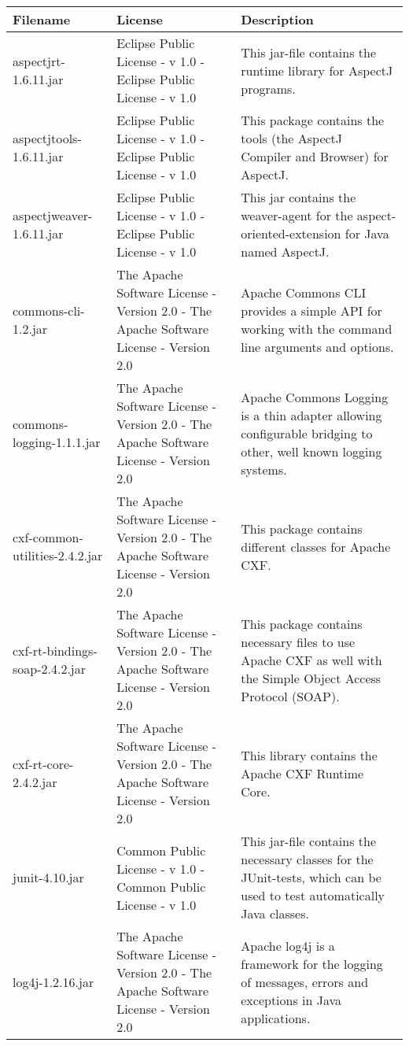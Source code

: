 \begin{center}
\begin{longtable}{|p{}|p{}|p{}|}
\hline 
Filename & License & Description\\
\hline
\hline 
aspectjrt-1.6.11.jar & Eclipse Public License - v 1.0 - Eclipse Public License - v 1.0 & This jar-file contains the runtime library for AspectJ programs.\\
\hline 
aspectjtools-1.6.11.jar & Eclipse Public License - v 1.0 - Eclipse Public License - v 1.0 & This package contains the tools (the AspectJ Compiler and Browser) for AspectJ.\\
\hline 
aspectjweaver-1.6.11.jar & Eclipse Public License - v 1.0 - Eclipse Public License - v 1.0 & This jar contains the weaver-agent for the aspect-oriented-extension for Java named AspectJ.\\
\hline 
commons-cli-1.2.jar & The Apache Software License - Version 2.0 - The Apache Software License - Version 2.0 & Apache Commons CLI provides a simple API for working with the command line arguments and options.\\
\hline 
commons-logging-1.1.1.jar & The Apache Software License - Version 2.0 - The Apache Software License - Version 2.0 & Apache Commons Logging is a thin adapter allowing configurable bridging to other, well known logging systems.\\
\hline 
cxf-common-utilities-2.4.2.jar & The Apache Software License - Version 2.0 - The Apache Software License - Version 2.0 & This package contains different classes for Apache CXF.\\
\hline 
cxf-rt-bindings-soap-2.4.2.jar & The Apache Software License - Version 2.0 - The Apache Software License - Version 2.0 & This package contains necessary files to use Apache CXF as well with the Simple Object Access Protocol (SOAP).\\
\hline 
cxf-rt-core-2.4.2.jar & The Apache Software License - Version 2.0 - The Apache Software License - Version 2.0 & This library contains the Apache CXF Runtime Core.\\
\hline 
junit-4.10.jar & Common Public License - v 1.0 - Common Public License - v 1.0 & This jar-file contains the necessary classes for the JUnit-tests, which can be used to test automatically Java classes.\\
\hline 
log4j-1.2.16.jar & The Apache Software License - Version 2.0 - The Apache Software License - Version 2.0 & Apache log4j is a framework for the logging of messages, errors and exceptions in Java applications.\\

\end{longtable}
\end{center}
